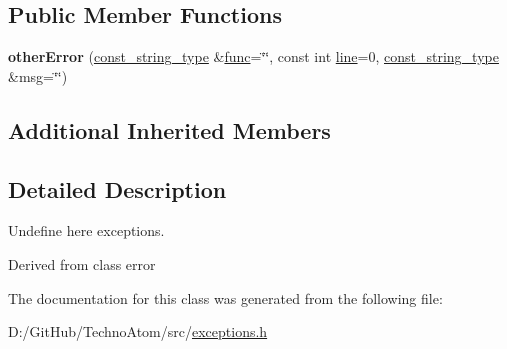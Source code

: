 \subsection*{Public Member Functions}
\begin{DoxyCompactItemize}
\item 
\mbox{\label{classatom_1_1other_error_a55d13dbae6599e17d7aa07afab4a40d3}} 
{\bfseries other\+Error} (\hyperlink{classatom_1_1error_ac330e9fb7cedcf4a173c5eb156d7bdaf}{const\+\_\+string\+\_\+type} \&\hyperlink{classatom_1_1error_a0a70a92b1638bfe4be7972651ae0c5c8}{func}=\char`\"{}\char`\"{}, const int \hyperlink{classatom_1_1error_aa9443d1a458d0dc6086372444a58e8c6}{line}=0, \hyperlink{classatom_1_1error_ac330e9fb7cedcf4a173c5eb156d7bdaf}{const\+\_\+string\+\_\+type} \&msg=\char`\"{}\char`\"{})
\end{DoxyCompactItemize}
\subsection*{Additional Inherited Members}


\subsection{Detailed Description}
Undefine here exceptions. 

Derived from class error 

The documentation for this class was generated from the following file\+:\begin{DoxyCompactItemize}
\item 
D\+:/\+Git\+Hub/\+Techno\+Atom/src/\hyperlink{exceptions_8h}{exceptions.\+h}\end{DoxyCompactItemize}
